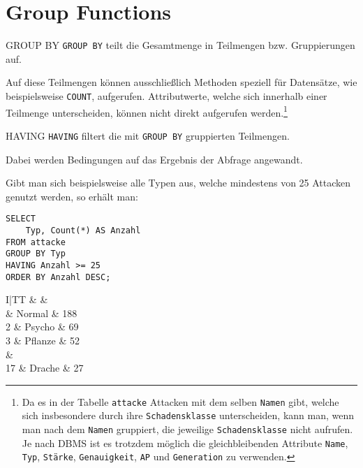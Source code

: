 \section{Group Functions}

\begin{sql}{GROUP BY}
    \texttt{GROUP BY} teilt die Gesamtmenge in Teilmengen bzw. Gruppierungen auf.
    
    Auf diese Teilmengen können ausschließlich Methoden speziell für Datensätze, wie beispielsweise \texttt{COUNT}, aufgerufen.
    Attributwerte, welche sich innerhalb einer Teilmenge unterscheiden, können nicht direkt aufgerufen werden.\footnote{
        Da es in der Tabelle \texttt{attacke} Attacken mit dem selben \texttt{Namen} gibt, welche sich insbesondere durch ihre \texttt{Schadensklasse} unterscheiden, kann man, wenn man nach dem \texttt{Namen} gruppiert, die jeweilige \texttt{Schadensklasse} nicht aufrufen.
        Je nach DBMS ist es trotzdem möglich die gleichbleibenden Attribute \texttt{Name}, \texttt{Typ}, \texttt{Stärke}, \texttt{Genauigkeit}, \texttt{AP} und \texttt{Generation} zu verwenden.
    }
\end{sql}

\begin{sql}{HAVING}
    \texttt{HAVING} filtert die mit \texttt{GROUP BY} gruppierten Teilmengen.
    
    Dabei werden Bedingungen auf das Ergebnis der Abfrage angewandt.

    Gibt man sich beispielsweise alle Typen aus, welche mindestens von 25 Attacken genutzt werden, so erhält man:
    
    \begin{verbatim}
SELECT
    Typ, Count(*) AS Anzahl
FROM attacke
GROUP BY Typ
HAVING Anzahl >= 25
ORDER BY Anzahl DESC;
    \end{verbatim}

    \begin{tabular}{I|TT}
        &  &  \\ & Normal & 188 \\
        2 & Psycho & 69 \\
        3 & Pflanze & 52 \\
         &  \\
        17 & Drache & 27 \\
    \end{tabular}
\end{sql}

